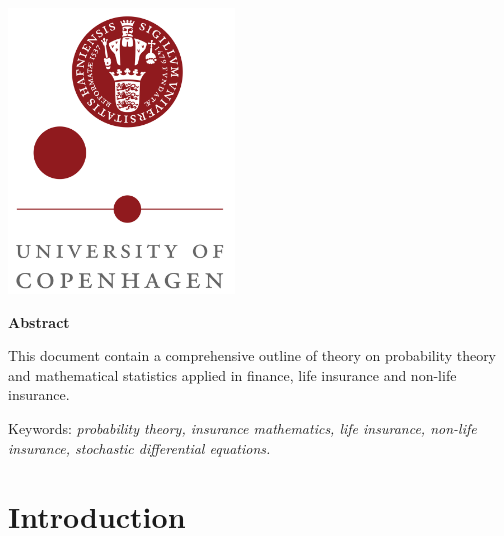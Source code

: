 \documentclass[
]{book}
\begin{document}
{\begin{titlepage}




\includegraphics[width = 0.45\textwidth]{logo_ku.png}%
 

\vfill %
\end{titlepage}

\thispagestyle{empty}
\begin{center}
\textbf{\large Abstract}
\end{center}

This document contain a comprehensive outline of theory on probability theory and mathematical statistics applied in finance, life insurance and non-life insurance.

Keywords: \emph{probability theory, insurance mathematics, life insurance,
non-life insurance, stochastic differential equations.}
\vfill
\pagebreak

\setcounter{tocdepth}{3}
\tableofcontents
}
\thispagestyle{empty}
\newpage
\setcounter{page}{1}
\pagestyle{fancy}
\hypertarget{introduction}{%
\chapter{Introduction}\label{introduction}}
\end{document}
